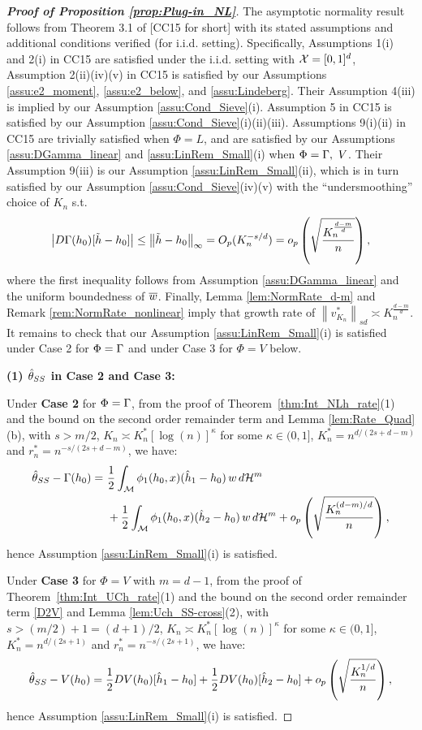 \documentclass[12pt,american]{article}
\newcommand{\cH}{\mathcal{H}}
\theoremstyle{definition}
\theoremstyle{plain}
\theoremstyle{definition}
\theoremstyle{plain}
\theoremstyle{plain}
\theoremstyle{plain}
\theoremstyle{plain}
\theoremstyle{plain}
\newcommand{\norm}[1]{\left\| #1 \right\|}
\newcommand{\abs}[1]{\left| #1 \right|}
\begin{document}
\begin{proof}[\textbf{Proof of Proposition \ref{prop:Plug-in_NL}}]
The asymptotic normality result follows from Theorem 3.1 of \cite{chen2015optimal}[CC15 for short] with its stated assumptions and additional conditions verified (for i.i.d. setting). Specifically, Assumptions 1(i) and 2(i) in CC15 are satisfied under the i.i.d. setting with ${\cal X} = [0,1]^d$, Assumption 2(ii)(iv)(v) in CC15 is satisfied by our Assumptions \ref{assu:e2_moment}, \ref{assu:e2_below}, and \ref{assu:Lindeberg}. Their Assumption 4(iii) is implied by our Assumption \ref{assu:Cond_Sieve}(i). Assumption 5 in CC15 is satisfied by our Assumption \ref{assu:Cond_Sieve}(i)(ii)(iii). Assumptions 9(i)(ii) in CC15 are trivially satisfied when $\Phi=L$, and are satisfied by our Assumptions \ref{assu:DGamma_linear} and \ref{assu:LinRem_Small}(i) when $\Phi=\Gamma,~V$. Their Assumption 9(iii) is our Assumption \ref{assu:LinRem_Small}(ii), which is in turn satisfied by our Assumption \ref{assu:Cond_Sieve}(iv)(v) with the ``undersmoothing'' choice of $K_n$ s.t. $$\abs{D\G(h_0)[\tilde{h}-h_0]}\leq \norm{\tilde{h}-h_0}_\infty = O_p(K_n^{-s/d}) = o_p\left(\sqrt{\frac{K_n^\frac{d-m}{d}}{n}}\right),$$
where the first inequality follows from Assumption \ref{assu:DGamma_linear} and the uniform boundedness of $\overline{w}$. Finally, Lemma \ref{lem:NormRate_d-m} and Remark \ref{rem:NormRate_nonlinear} imply that growth rate of $\norm{v^*_{K_n}}_{sd} \asymp K_n^\frac{d-m}{d}$.
It remains to check that our Assumption \ref{assu:LinRem_Small}(i) is satisfied under Case 2 for $\Phi=\Gamma$ and under Case 3 for $\Phi=V$ below.

\medskip

\noindent\textbf{(1) $\hat{\theta}_{SS}$ in Case 2 and Case 3:}

Under \textbf{Case 2} for $\Phi=\Gamma$, from the proof of Theorem~\ref{thm:Int_NLh_rate}(1) and the bound on the second order remainder term and Lemma \ref{lem:Rate_Quad}(b), with $s>m/2$, $K_{n}\asymp K^*_n [\log(n)]^{\kappa}$ for some $\kappa \in (0,1]$, $K^*_n=n^{d/(2s+d-m)}$ and $r^*_n=n^{-s/(2s+d-m)}$, we have:
\begin{align*}
\hat{\t}_{SS}-\G(h_0)=\ & \frac{1}{2}\int_\cM \phi_1(h_0,x)(\hat{h}_1 - h_0)\, w\, d\cH^m \\ &+\frac{1}{2}\int_\cM \phi_1(h_0,x)(\hat{h}_2 - h_0)\, w\, d\cH^m  +o_p\left( \sqrt{\frac{K_n^{(d-m)/d}}{n}}\right),    
\end{align*}
hence Assumption \ref{assu:LinRem_Small}(i) is satisfied.

Under \textbf{Case 3} for $\Phi=V$ with $m=d-1$, from the proof of Theorem~\ref{thm:Int_UCh_rate}(1) and the bound on the second order remainder term \eqref{D2V} and Lemma \ref{lem:Uch_SS-cross}(2), with $s>(m/2)+1=(d+1)/2$,  $K_{n}\asymp K^*_n [\log(n)]^{\kappa}$ for some $\kappa \in (0,1]$, $K^*_n=n^{d/(2s+1)}$ and $r^*_n=n^{-s/(2s+1)}$, we have:
\[
\hat{\theta}_{SS}-V(h_0)=\frac{1}{2}DV(h_0)[\hat{h}_1 - h_0]+\frac{1}{2}DV(h_0)[\hat{h}_2 - h_0]+o_p\left( \sqrt{\frac{K_n^{1/d}}{n}}\right),
\]
hence Assumption \ref{assu:LinRem_Small}(i) is satisfied.


\end{proof}
\end{document}

